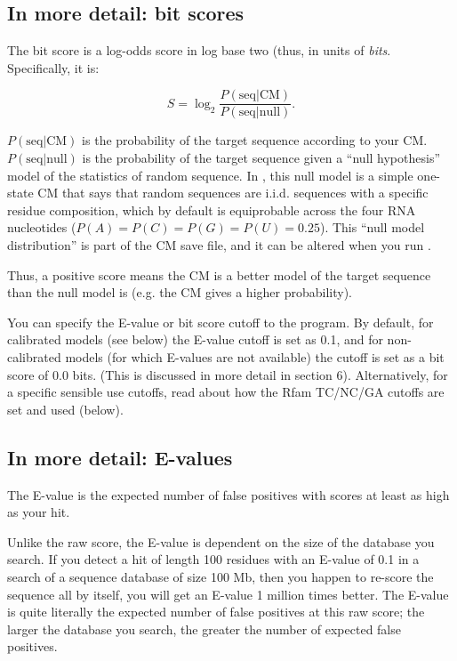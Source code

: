 \subsection{In more detail:  bit scores}

The bit score is a log-odds score in log base two (thus, in units of
{\em bits}. Specifically, it is:

\[
	S = \log_2 \frac {P( \mbox{seq} | \mbox{CM})} { P (\mbox{seq} |
	\mbox{null})}.
\]

$P( \mbox{seq} | \mbox{CM})$ is the probability of the target
sequence according to your CM. $ P (\mbox{seq} | \mbox{null}) $ is
the probability of the target sequence given a ``null hypothesis''
model of the statistics of random sequence. In , this null model
is a simple one-state CM that says that random sequences are i.i.d.
sequences with a specific residue composition, which by default is
equiprobable across the four RNA nucleotides ($P(A) = P(C) = P(G) =
P(U) = 0.25$). This ``null model distribution'' is part of the CM save
file, and it can be altered when you run .

Thus, a positive score means the CM is a better model of the target
sequence than the null model is (e.g. the CM gives a higher
probability).

You can specify the E-value or bit score cutoff to the 
program. By default, for calibrated models (see below) the E-value
cutoff is set as 0.1, and for non-calibrated models (for which
E-values are not available) the cutoff is set as a bit score of 0.0
bits. (This is discussed in more detail in section 6). Alternatively,
for a specific sensible use cutoffs, read about how the Rfam
TC/NC/GA cutoffs are set and used (below).

\subsection{In more detail:  E-values}

The E-value is the expected number of false positives with scores at
least as high as your hit.

Unlike the raw score, the E-value is dependent on the size of the
database you search. If you detect a hit of length 100 residues 
with an E-value of 0.1 in a search of a sequence database of size 100
Mb, then you happen to re-score the sequence all by itself, you will
get an E-value 1 million times better. The E-value is quite literally
the expected number of false positives at this raw score; the larger
the database you search, the greater the number of expected false
positives.

